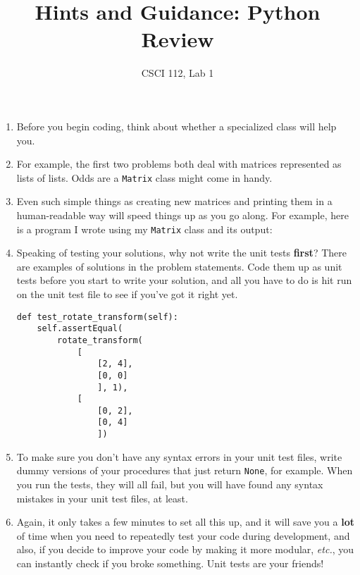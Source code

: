 \documentclass[12pt]{article}
\title{Hints and Guidance: Python Review}
\author{CSCI 112, Lab 1}
\date{}
\newcommand{\li}{\item}
\begin{document}
\sloppy

\maketitle
\begin{enumerate}
\li Before you begin coding, think about whether a specialized class 
will help you. 
\li For example, the first two problems both deal with matrices represented as
lists of lists.  Odds are a \lstinline{Matrix} class might come in handy.
\li Even such simple things as creating new matrices and printing them in a
human-readable way will speed things up as you go along.  For example,
here is a program I wrote using my \lstinline{Matrix} class and its output:
\li 
\begin{multicols}{2}
Speaking of testing your solutions, why not write the unit tests {\bf first}?
There are examples of solutions in the problem statements.  Code them up
as unit tests before you start to write your solution, 
and all you have to do is hit run on the unit test file to see if you've got it right
yet.
\columnbreak
\begin{lstlisting}
def test_rotate_transform(self):
    self.assertEqual(
        rotate_transform(
            [
                [2, 4],
                [0, 0]
                ], 1),
            [
                [0, 2],
                [0, 4]
                ])
\end{lstlisting}
\end{multicols}
\li To make sure you don't have any syntax errors in your unit test files, write 
dummy versions of your procedures that just return \lstinline{None}, for example.
When you run the tests, they will all fail, but you will have found any syntax mistakes
in your unit test files, at least.
\li Again, it only takes a few minutes to set all this up, and it will save you a {\bf lot} of time
when you need to repeatedly test your code during development, and also, if you
decide to improve your code by making it more modular, {\em etc.}, you can instantly
check if you broke something.  Unit tests are your friends!


\end{enumerate}
\end{document}
